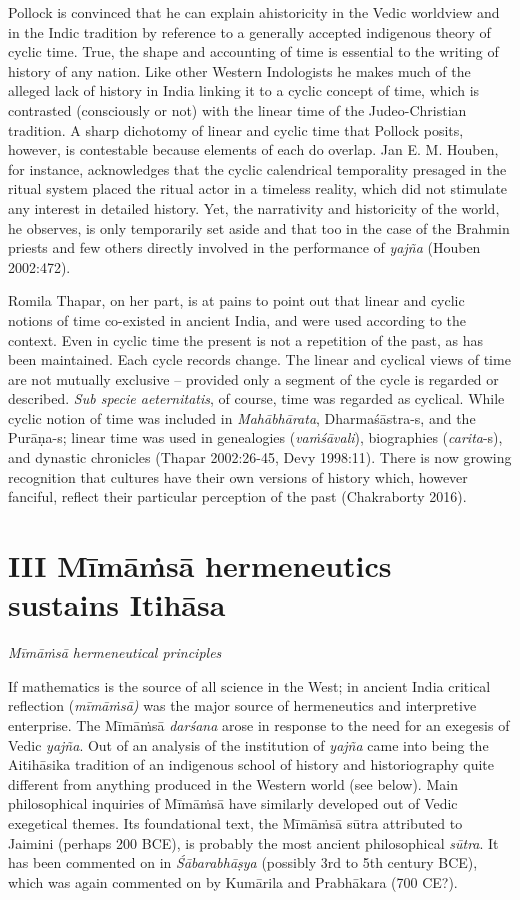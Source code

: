 Pollock is convinced that he can explain ahistoricity in the Vedic worldview and in the Indic tradition by reference to a generally accepted indigenous theory of cyclic time. True, the shape and accounting of time is essential to the writing of history of any nation. Like other Western Indologists he makes much of the alleged lack of history in India linking it to a cyclic concept of time, which is contrasted (consciously or not) with the linear time of the Judeo-Christian tradition. A sharp dichotomy of linear and cyclic time that Pollock posits, however, is contestable because elements of each do overlap. Jan E. M. Houben, for instance, acknowledges that the cyclic calendrical temporality presaged in the ritual system placed the ritual actor in a timeless reality, which did not stimulate any interest in detailed history. Yet, the narrativity and historicity of the world, he observes, is only temporarily set aside and that too in the case of the Brahmin priests and few others directly involved in the performance of \textit{yajña} (Houben 2002:472).

Romila Thapar, on her part, is at pains to point out that linear and cyclic notions of time co-existed in ancient India, and were used according to the context. Even in cyclic time the present is not a repetition of the past, as has been maintained. Each cycle records change. The linear and cyclical views of time are not mutually exclusive -- provided only a segment of the cycle is regarded or described. \textit{Sub specie aeternitatis}, of course, time was regarded as cyclical. While cyclic notion of time was included in \textit{Mahābhārata}, Dharmaśāstra-s, and the Purāṇa-s; linear time was used in genealogies (\textit{vaṁśāvali}), biographies (\textit{carita}-s), and dynastic chronicles (Thapar 2002:26-45, Devy 1998:11). There is now growing recognition that cultures have their own versions of history which, however fanciful, reflect their particular perception of the past (Chakraborty 2016).


\section*{III Mīmāṁsā hermeneutics sustains Itihāsa}

\textit{Mīmāṁsā hermeneutical principles}

If mathematics is the source of all science in the West; in ancient India critical reflection (\textit{mīmāṁsā) }was the major source of hermeneutics and interpretive enterprise. The Mīmāṁsā \textit{darśana} arose in response to the need for an exegesis of Vedic \textit{yajña}. Out of an analysis of the institution of \textit{yajña} came into being the Aitihāsika tradition of an indigenous school of history and historiography quite different from anything produced in the Western world (see below). Main philosophical inquiries of Mīmāṁsā have similarly developed out of Vedic exegetical themes. Its foundational text, the Mīmāṁsā sūtra attributed to Jaimini (perhaps 200 BCE), is probably the most ancient philosophical \textit{sūtra}. It has been commented on in \textit{Śābarabhāṣya} (possibly 3rd to 5th century BCE), which was again commented on by Kumārila and Prabhākara (700 CE?).

